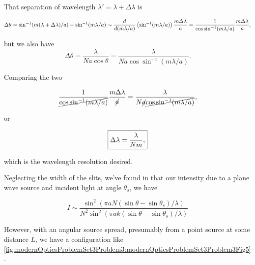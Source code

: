 {

That separation of wavelength $\lambda' = \lambda + \Delta \lambda$ is

\begin{dmath}\label{eqn:modernOptics:problemSet3:3:480}
\Delta \theta
=
\sin^{-1}(m (\lambda + \Delta \lambda)/a)
-
\sin^{-1}(m \lambda/ a)
\sim
\frac{d}{d (m\lambda/a)} \left( \sin^{-1}(m \lambda/ a) \right) \frac{ m \Delta \lambda}{a}
=
\inv{\cos\sin^{-1} (m \lambda/a)}
\frac{ m \Delta \lambda}{a},
\end{dmath}

but we also have
\begin{dmath}\label{eqn:modernOptics:problemSet3:3:500}
\Delta \theta
=
\frac{\lambda}{N a \cos\theta}
=
\frac{\lambda}{N a \cos\sin^{-1}(m \lambda/a)}.
\end{dmath}

Comparing the two

\begin{dmath}\label{eqn:modernOptics:problemSet3:3:520}
\inv{\cancel{\cos\sin^{-1} (m \lambda/a)}}
\frac{ m \Delta \lambda}{\cancel{a}}
=
\frac{\lambda}{N \cancel{a} \cancel{\cos\sin^{-1}(m \lambda/a)}},
\end{dmath}

or

\begin{dmath}\label{eqn:modernOptics:problemSet3:3:540}
\myBoxed{
\Delta \lambda
=
\frac{\lambda}{N m},
}
\end{dmath}

which is the wavelength resolution desired.


Neglecting the width of the slits, we've found in  that our intensity due to a plane wave source and incident light at angle $\theta_s$, we have

\begin{dmath}\label{eqn:modernOptics:problemSet3:3:560}
I \sim
\frac
{\sin^2( \pi a N (\sin\theta - \sin\theta_s)/\lambda )}
{N^2 \sin^2( \pi a k (\sin\theta - \sin\theta_s)/\lambda )}
\end{dmath}

However, with an angular source spread, presumably from a point source at some distance $L$, we have a configuration like \cref{fig:modernOpticsProblemSet3Problem3:modernOpticsProblemSet3Problem3Fig5}.

}
